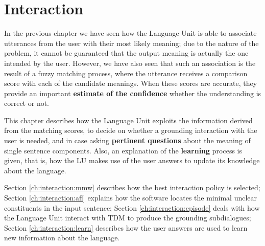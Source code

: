 
\chapter{Interaction} %

\label{ch:interaction} %


In the previous chapter we have seen how the Language Unit is able to associate utterances from the user with their most likely meaning; due to the nature of the problem, it cannot be guaranteed that the output meaning is actually the one intended by the user. However, we have also seen that such an association is the result of a fuzzy matching process, where the utterance receives a comparison score with each of the candidate meanings. When these scores are accurate, they provide an important \textbf{estimate of the confidence} whether the understanding is correct or not.

This chapter describes how the Language Unit exploits the information derived from the matching scores, to decide on whether a grounding interaction with the user is needed, and in case asking \textbf{pertinent questions} about the meaning of single sentence components. Also, an explanation of the \textbf{learning} process is given, that is, how the LU makes use of the user answers to update its knowledge about the language.

Section \ref{ch:interaction:mmw} describes how the best interaction policy is selected; Section \ref{ch:interaction:afl} explains how the software locates the minimal unclear constituents in the input sentence; Section \ref{ch:interaction:episode} deals with how the Language Unit interact with TDM to produce the grounding subdialogues; Section \ref{ch:interaction:learn} describes how the user answers are used to learn new information about the language.


